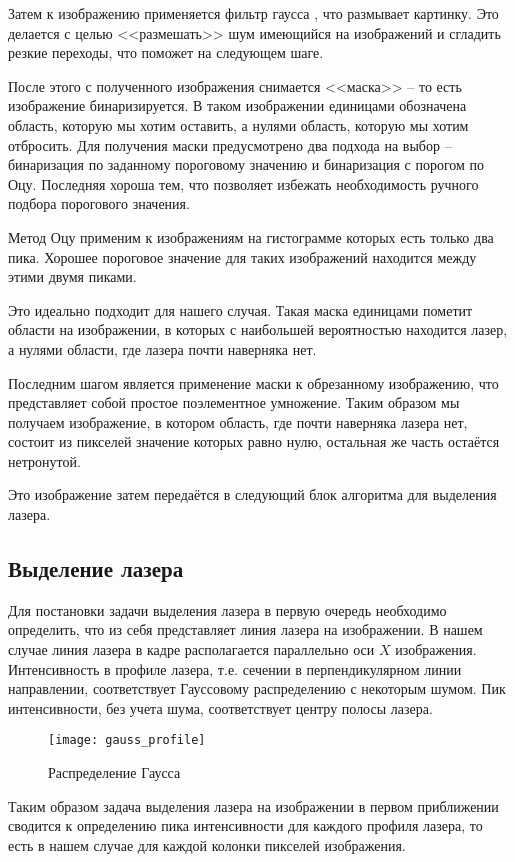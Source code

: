             Затем к изображению применяется фильтр гаусса , что размывает картинку. Это делается с целью <<размешать>> шум имеющийся на изображений и сгладить резкие переходы, что поможет на следующем шаге. 
            
            После этого с полученного изображения снимается <<маска>> -- то есть изображение бинаризируется. В таком изображении единицами обозначена область, которую мы хотим оставить, а нулями область, которую мы хотим отбросить. Для получения маски предусмотрено два подхода на выбор -- бинаризация по заданному пороговому значению и бинаризация с порогом по Оцу. Последняя хороша тем, что позволяет избежать необходимость ручного подбора порогового значения. 
            
            Метод Оцу применим к изображениям на гистограмме которых есть только два пика. Хорошее пороговое значение для таких изображений находится между этими двумя пиками\cite{opencvTHRESH}.
            
            Это идеально подходит для нашего случая. Такая маска единицами пометит области на изображении, в которых с наибольшей вероятностью находится лазер, а нулями области, где лазера почти наверняка нет.
            
            Последним шагом является применение маски к обрезанному изображению, что представляет собой простое поэлементное умножение. Таким образом мы получаем изображение, в котором область, где почти наверняка лазера нет, состоит из пикселей значение которых равно нулю, остальная же часть остаётся нетронутой.

            Это изображение затем передаётся в следующий блок алгоритма для выделения лазера.

        \subsection{Выделение лазера}
            Для постановки задачи выделения лазера в первую очередь необходимо определить, что из себя представляет линия лазера на изображении. В нашем случае линия лазера в кадре располагается параллельно оси $ X $ изображения. Интенсивность в профиле лазера, т.е. сечении в перпендикулярном линии направлении, соответствует Гауссовому распределению\cite{Qi2013, Molder2014} с некоторым шумом. Пик интенсивности, без учета шума, соответствует центру полосы лазера.
            \begin{wrapfigure}{l}{0.4\linewidth}
                \centering
                \texttt{[image: gauss\_profile]}
                \caption{Распределение Гаусса}
                \label{pic:gauss_profile}
            \end{wrapfigure}
            Таким образом задача выделения лазера на изображении в первом приближении сводится к определению пика интенсивности для каждого профиля лазера, то есть в нашем случае для каждой колонки пикселей изображения.
            
